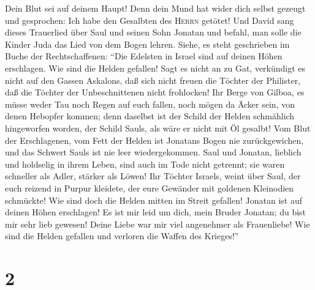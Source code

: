 Dein Blut sei auf deinem Haupt! Denn dein Mund hat wider dich selbst
gezeugt und gesprochen: Ich habe den Gesalbten des \textsc{Herrn}
getötet!  Und David sang dieses Trauerlied über Saul und
seinen Sohn Jonatan  und befahl, man solle die Kinder
Juda das Lied von dem Bogen lehren. Siehe, es steht geschrieben im Buche
der Rechtschaffenen:  ``Die Edelsten in Israel sind auf
deinen Höhen erschlagen. Wie sind die Helden gefallen! 
Sagt es nicht an zu Gat, verkündigt es nicht auf den Gassen Askalons,
daß sich nicht freuen die Töchter der Philister, daß die Töchter der
Unbeschnittenen nicht frohlocken!  Ihr Berge von Gilboa,
es müsse weder Tau noch Regen auf euch fallen, noch mögen da Äcker sein,
von denen Hebopfer kommen; denn daselbst ist der Schild der Helden
schmählich hingeworfen worden, der Schild Sauls, als wäre er nicht mit
Öl gesalbt!  Vom Blut der Erschlagenen, vom Fett der
Helden ist Jonatans Bogen nie zurückgewichen, und das Schwert Sauls ist
nie leer wiedergekommen.  Saul und Jonatan, lieblich und
holdselig in ihrem Leben, sind auch im Tode nicht getrennt; sie waren
schneller als Adler, stärker als Löwen!  Ihr Töchter
Israels, weint über Saul, der euch reizend in Purpur kleidete, der eure
Gewänder mit goldenen Kleinodien schmückte!  Wie sind
doch die Helden mitten im Streit gefallen! Jonatan ist auf deinen Höhen
erschlagen!  Es ist mir leid um dich, mein Bruder
Jonatan; du bist mir sehr lieb gewesen! Deine Liebe war mir viel
angenehmer als Frauenliebe!  Wie sind die Helden gefallen
und verloren die Waffen des Krieges!''

\hypertarget{section-1}{%
\section{2}\label{section-1}}

